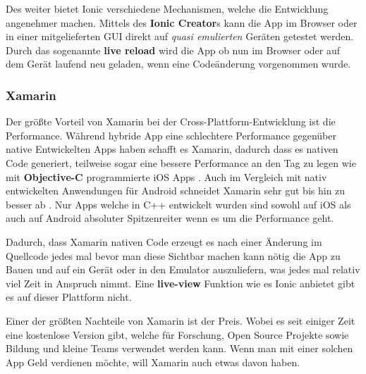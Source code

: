 Des weiter bietet Ionic verschiedene Mechanismen, welche die Entwicklung angenehmer machen. Mittels des \textbf{Ionic Creator}s kann die App im Browser oder in einer mitgelieferten GUI direkt auf \textit{quasi emulierten} Geräten getestet werden. Durch das sogenannte \textbf{live reload} wird die App ob nun im Browser oder auf dem Gerät laufend neu geladen, wenn eine Codeänderung vorgenommen wurde.


\subsubsection{Xamarin}
Der größte Vorteil von Xamarin bei der Cross-Plattform-Entwicklung ist die Performance. Während hybride App eine  schlechtere Performance gegenüber native Entwickelten Apps haben schafft es Xamarin, dadurch dass es nativen Code generiert, teilweise sogar eine bessere Performance an den Tag zu legen wie mit \textbf{Objective-C} programmierte iOS Apps \cite{WINUNIT16}. Auch im Vergleich mit nativ entwickelten Anwendungen für Android schneidet Xamarin sehr gut bis hin zu besser ab \cite{MEDIUM16}. Nur Apps welche in C++ entwickelt wurden sind sowohl auf iOS als auch auf Android absoluter Spitzenreiter wenn es um die Performance geht.

Dadurch, dass Xamarin nativen Code erzeugt es nach einer Änderung im Quellcode jedes mal bevor man diese Sichtbar machen kann nötig die App zu Bauen und auf ein Gerät oder in den Emulator auszuliefern, was jedes mal relativ viel Zeit in Anspruch nimmt. Eine \textbf{live-view} Funktion wie es Ionic anbietet gibt es auf dieser Plattform nicht.

Einer der größten Nachteile von Xamarin ist der Preis. Wobei es seit einiger Zeit eine kostenlose Version gibt, welche für Forschung, Open Source Projekte sowie Bildung und kleine Teams verwendet werden kann. Wenn man mit einer solchen App Geld verdienen möchte, will Xamarin auch etwas davon haben.




